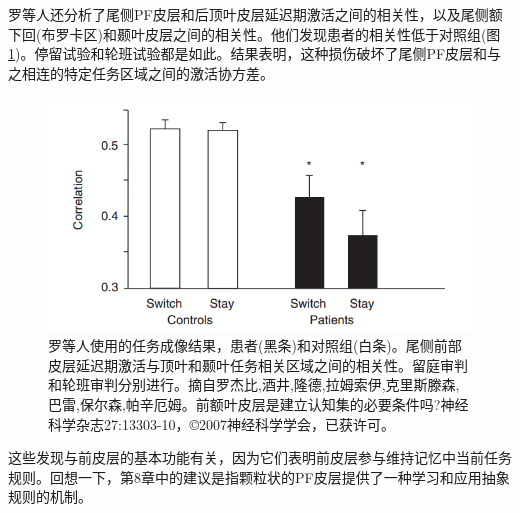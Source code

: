 \par
罗等人还分析了尾侧PF皮层和后顶叶皮层延迟期激活之间的相关性，以及尾侧额下回(布罗卡区)和颞叶皮层之间的相关性。他们发现患者的相关性低于对照组(图\ref{fig:fig_9_6})。停留试验和轮班试验都是如此。结果表明，这种损伤破坏了尾侧PF皮层和与之相连的特定任务区域之间的激活协方差。
\par
\begin{figure}[!htb]
	\centering
	\includegraphics[width=0.5\linewidth]{image_pfc/Fig_9_6}
	\caption{罗等人使用的任务成像结果，患者(黑条)和对照组(白条)。尾侧前部皮层延迟期激活与顶叶和颞叶任务相关区域之间的相关性。留庭审判和轮班审判分别进行。摘自罗杰比,酒井,隆德,拉姆索伊,克里斯滕森,巴雷,保尔森,帕辛厄姆。前额叶皮层是建立认知集的必要条件吗?神经科学杂志27:13303-10，©2007神经科学学会，已获许可。\label{fig:fig_9_6}}
\end{figure}

\par
这些发现与前皮层的基本功能有关，因为它们表明前皮层参与维持记忆中当前任务规则。回想一下，第8章中的建议是指颗粒状的PF皮层提供了一种学习和应用抽象规则的机制。
